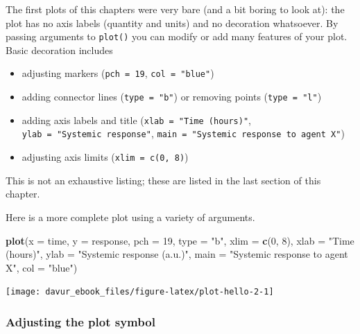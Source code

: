 \documentclass[]{book}
\newenvironment{Shaded}{\begin{snugshade}}{\end{snugshade}}
\newcommand{\DataTypeTok}[1]{\textcolor[rgb]{0.13,0.29,0.53}{#1}}
\newcommand{\DecValTok}[1]{\textcolor[rgb]{0.00,0.00,0.81}{#1}}
\newcommand{\KeywordTok}[1]{\textcolor[rgb]{0.13,0.29,0.53}{\textbf{#1}}}
\newcommand{\NormalTok}[1]{#1}
\newcommand{\StringTok}[1]{\textcolor[rgb]{0.31,0.60,0.02}{#1}}
\providecommand{\tightlist}{%
  \setlength{\itemsep}{0pt}\setlength{\parskip}{0pt}}
\begin{document}
The first plots of this chapters were very bare (and a bit boring to look at): the plot has no axis labels (quantity and units) and no decoration whatsoever. By passing arguments to \texttt{plot()} you can modify or add many features of your plot. Basic decoration includes

\begin{itemize}
\tightlist
\item
  adjusting markers (\texttt{pch\ =\ 19}, \texttt{col\ =\ "blue"})
\item
  adding connector lines (\texttt{type\ =\ "b"}) or removing points (\texttt{type\ =\ "l"})
\item
  adding axis labels and title (\texttt{xlab\ =\ "Time\ (hours)"}, \texttt{ylab\ =\ "Systemic\ response"}, \texttt{main\ =\ "Systemic\ response\ to\ agent\ X"})
\item
  adjusting axis limits (\texttt{xlim\ =\ c(0,\ 8)})
\end{itemize}

This is not an exhaustive listing; these are listed in the last section of this chapter.

Here is a more complete plot using a variety of arguments.

\begin{Shaded}
\begin{Highlighting}[]
\KeywordTok{plot}\NormalTok{(}\DataTypeTok{x =}\NormalTok{ time, }\DataTypeTok{y =}\NormalTok{ response, }\DataTypeTok{pch =} \DecValTok{19}\NormalTok{, }\DataTypeTok{type =} \StringTok{"b"}\NormalTok{, }\DataTypeTok{xlim =} \KeywordTok{c}\NormalTok{(}\DecValTok{0}\NormalTok{, }\DecValTok{8}\NormalTok{),}
     \DataTypeTok{xlab =} \StringTok{"Time (hours)"}\NormalTok{, }\DataTypeTok{ylab =} \StringTok{"Systemic response (a.u.)"}\NormalTok{,}
     \DataTypeTok{main =} \StringTok{"Systemic response to agent X"}\NormalTok{, }\DataTypeTok{col =} \StringTok{"blue"}\NormalTok{)}
\end{Highlighting}
\end{Shaded}

\begin{center}\texttt{[image: davur\_ebook\_files/figure-latex/plot-hello-2-1]} \end{center}

\hypertarget{adjusting-the-plot-symbol}{%
\subsubsection*{Adjusting the plot symbol}\label{adjusting-the-plot-symbol}}
\end{document}
